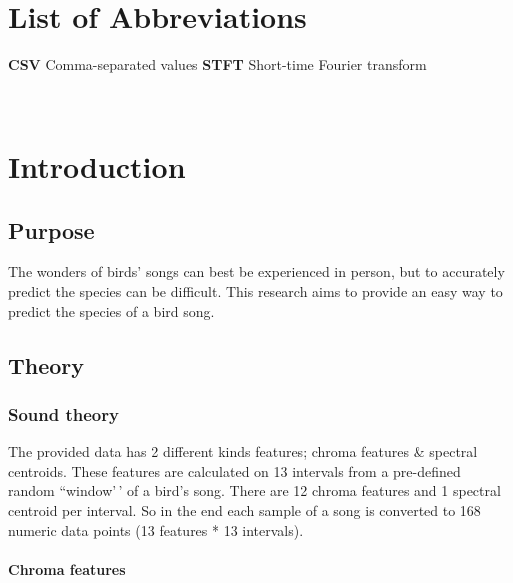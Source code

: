 \documentclass[
]{article}
\begin{document}
\label{sec:summ}~
\newpage

\section*{List of Abbreviations}

\textbf{CSV} Comma-separated values
\textbf{STFT} Short-time Fourier transform

\label{sec:abvs}~

\newpage

{
\setcounter{tocdepth}{2}
\tableofcontents
}
\newpage


\hypertarget{introduction}{%
\section{Introduction}\label{introduction}}

\hypertarget{purpose}{%
\subsection{Purpose}\label{purpose}}

The wonders of birds' songs can best be experienced in person, but to
accurately predict the species can be difficult. This research aims to
provide an easy way to predict the species of a bird song.

\hypertarget{theory}{%
\subsection{Theory}\label{theory}}

\hypertarget{sound-theory}{%
\subsubsection{Sound theory}\label{sound-theory}}

The provided data has 2 different kinds features; chroma features \&
spectral centroids. These features are calculated on 13 intervals from a
pre-defined random ``window'\,' of a bird's song. There are 12 chroma
features and 1 spectral centroid per interval. So in the end each sample
of a song is converted to 168 numeric data points (13 features * 13
intervals).

\hypertarget{chroma-features}{%
\paragraph{Chroma features}\label{chroma-features}}
\end{document}
